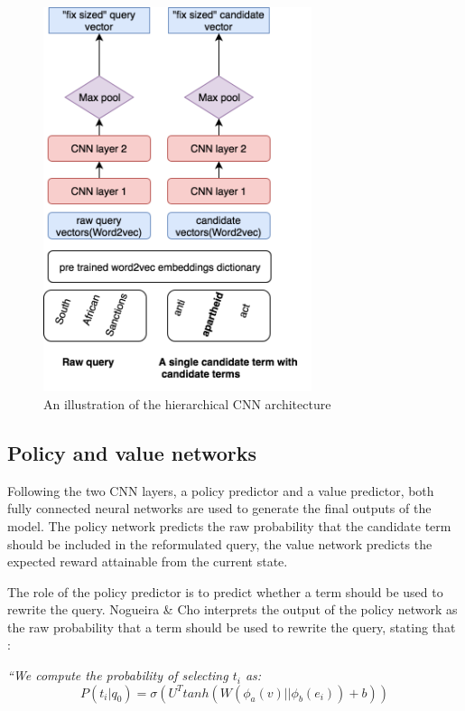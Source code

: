 \begin{figure}[H]
	\centering
	\includegraphics[width=0.7\textwidth]{images/chapter_4/Chapter_4-CNN.png}
	\caption{An illustration of the hierarchical CNN architecture}
	\label{fig:CNN1}
\end{figure}



\subsection{Policy and value networks}

Following the two CNN layers, a policy predictor and a value predictor, both fully connected neural networks are used to generate the final outputs of the model. The policy network predicts the raw probability that the candidate term should be included in the reformulated query, the value network predicts the expected reward attainable from the current state.

The role of the policy predictor is to predict whether a term should be used to rewrite the query. Nogueira \& Cho\cite{nogueira2017task} interprets the output of the policy network as the raw probability that a term should be used to rewrite the query, stating that :

\textit{``We compute the probability of selecting $t_i$ as:}
\begin{equation}
P(t_i|q_0) = \sigma(U^T tanh(W(\phi_a(v)|| \phi_b(e_i)) + b))
\end{equation}

